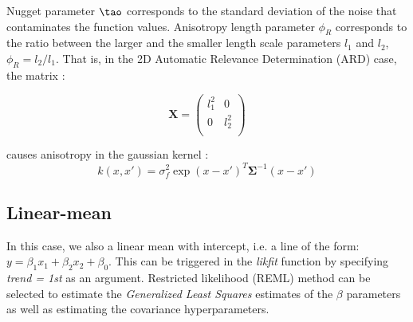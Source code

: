 \documentclass[a4paper]{article}
\begin{document}
Nugget parameter $\tao$ corresponds to the standard deviation of the noise that contaminates the function values. Anisotropy length parameter $\phi_{R}$ corresponds to the ratio between the larger and the smaller length scale parameters $l_1$ and $l_2$, $\phi_{R} = l_2/l_1$. That is, in the 2D Automatic Relevance Determination (ARD) case, the matrix :

\begin{equation*}
\mathbf{X} = \left(
\begin{array}{ccc}
l_{1}^{2} & 0             \\
0             & l_{2}^{2} \\
\end{array} \right)
\end{equation*}

causes anisotropy in the gaussian kernel :\\

\begin{equation*}
k(x,x') = \sigma_f^2 \exp{(x-x')^{T}\mathbf{\Sigma}^{-1}(x-x')}
\end{equation*}

\subsection{Linear-mean}
In this case, we also a linear mean with intercept, i.e. a line of the form: $y = \beta_1 x_1 + \beta_2 x_2 + \beta_0$. This can be triggered in the \emph{likfit} function by specifying \emph{trend = 1st} as an argument.
Restricted likelihood (REML) method can be selected to estimate the \emph{Generalized Least Squares} estimates of the $\beta$ parameters as well as estimating the covariance hyperparameters.
\end{document}

